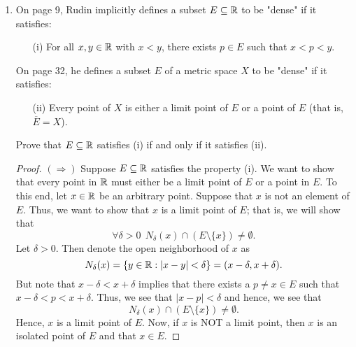 \documentclass[a4paper]{article}
\begin{document}
\begin{enumerate}
\begin{proof}
    \end{proof}
\item On page 9, Rudin implicitly defines a subset \( E \subseteq \mathbb{R}   \) to be "dense" if it satisfies:
    \begin{enumerate}
        \item[(i)] For all \( x,y \in \mathbb{R}  \) with \( x < y  \), there exists \( p \in E  \) such that \( x < p < y  \).
    \end{enumerate}
    On page 32, he defines a subset \( E  \) of a metric space \( X  \) to be "dense" if it satisfies:
    \begin{enumerate}
        \item[(ii)] Every point of \( X  \) is either a limit point of \( E  \) or a point of \( E  \) (that is, \( \overline{E} = X  \)).
    \end{enumerate}
    Prove that \( E \subseteq \mathbb{R}  \) satisfies (i) if and only if it satisfies (ii).
    \begin{proof}
    \( (\Longrightarrow) \) Suppose \( E \subseteq \mathbb{R}  \) satisfies the property (i). We want to show that every point in \( \mathbb{R}  \) must either be a limit point of \( E  \) or a point in \( E  \). To this end, let \( x \in \mathbb{R}  \) be an arbitrary point. Suppose that \( x  \) is not an element of \( E  \). Thus, we want to show that \( x  \) is a limit point of \( E  \); that is, we will show that 
    \[  \forall \delta > 0 \ \ {N}_{\delta}(x) \cap (E \setminus  \{ x  \})  \neq \emptyset. \]
    Let \( \delta > 0 \). Then denote the open neighborhood of \( x  \) as 
    \[  {N}_{\delta}(x) = \{ y \in \mathbb{R} : | x - y | < \delta \} = (x - \delta, x  + \delta).  \]
    But note that \( x - \delta < x + \delta  \) implies that there exists a \( p \neq x  \in E  \) such that \( x - \delta < p < x + \delta \). Thus, we see that \( |  x - p  |  < \delta  \) and hence, we see that 
    \[  {N}_{\delta}(x) \cap (E \setminus  \{ x \} ) \neq \emptyset.  \]
    Hence, \( x  \) is a limit point of \( E  \). Now, if \( x  \) is NOT a limit point, then \( x  \) is an isolated point of \( E  \) and that \(  x \in E  \).
    

\end{proof}
\end{enumerate}
\end{document}
